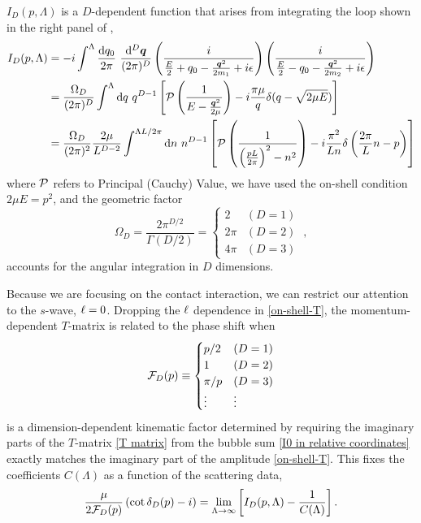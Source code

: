 $I_D(p,\Lambda)$ is a $D$-dependent function that arises from integrating the loop shown in the right panel of ,
\begin{align}
    I_D(p, \Lambda)
    &=-i\int^{\Lambda}
        \frac { \mathrm {d}q_0}{2\pi}\ \frac{\mathrm { d } ^ { D } \vec{ q } } { (2\pi)^ { D } }
        \left( \frac { i } { \frac{E}{2} + q _ { 0 } - \frac{\vec{q}^2}{2m_1} + i \epsilon } \right)
        \left( \frac { i } { \frac{E}{2} - q _ { 0 } - \frac{\vec{q}^2}{2m_2} + i \epsilon } \right)
    \label{eq:I0 in two particle language}\\
    &=\frac{\Omega_D}{(2\pi)^D}\int^{\Lambda}  \mathrm { d } q \ q^{D-1}\left[\PV \left( \frac { 1 } { E - \frac{\vec{q}^2}{2\mu} } \right)
-i\frac{\pi \mu}{q}\delta(q-\sqrt{2 \mu E})\right]
    \label{eq:I0 in relative coordinates}
    \\
    &=\frac{\Omega_D}{(2\pi)^2}\frac{2\mu}{L^{D-2}}\int^{\Lambda L/2\pi}  \mathrm { d } n \ n^{D-1}\left[\PV \left( \frac { 1 } { \left(\frac{pL}{2\pi}\right)^2 - n^2 } \right)
-i\frac{\pi^2}{L n}\delta\left(\frac{2\pi}{L}n -p\right)\right]
    \label{eq:I0}
\end{align}
where $\mathcal{P}$ refers to Principal (Cauchy) Value, we have used the on-shell condition $2\mu E=p^2$, and the geometric factor
\begin{equation}
\Omega_D=\frac{2\pi^{D/2}}{\Gamma(D/2)}=
    \begin{cases}
    	2       &   (D=1)\\
		2\pi    &   (D=2)\\
        4\pi    &   (D=3)
    \end{cases}\ ,
\end{equation}
accounts for the angular integration in $D$ dimensions.

Because we are focusing on the contact interaction, we can restrict our attention to the $s$-wave, $\ell=0$.
Dropping the $\ell$ dependence in \eqref{on-shell-T}, the momentum-dependent $T$-matrix is related to the phase shift when
\begin{equation}\label{eq:spherical FD}
    \mathcal{F}_{D}(p)
    \equiv
    \begin{cases}
        p/2     & (D=1)\\
        1       & (D=2)\\
        \pi/p   & (D=3)\\
        \vdots  & \vdots
\end{cases}
\end{equation}
is a dimension-dependent kinematic factor determined by requiring the imaginary parts of the $T$-matrix \eqref{T matrix} from the bubble sum \eqref{I0 in relative coordinates} exactly matches the imaginary part of the amplitude \eqref{on-shell-T}.
This fixes the coefficients $C(\Lambda)$ as a function of the scattering data,
\begin{equation}\label{eq:IV pole}
    \frac{\mu}{2 \mathcal{F}_{D}(p)}\left(\cot \delta_{D}(p) - i\right)
    =
    \lim\limits_{\Lambda \to \infty} \left[ I_D(p, \Lambda) - \frac{1}{C(\Lambda)} \right].
\end{equation}

